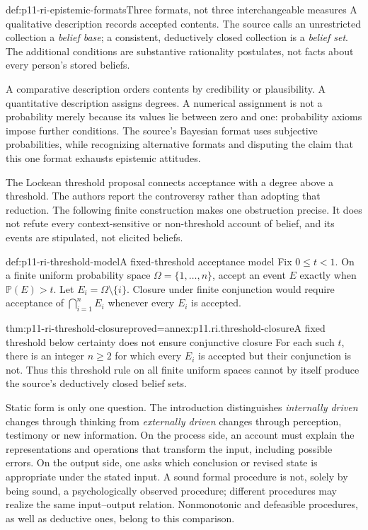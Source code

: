 \begin{hbdefinition}{def:p11-ri-epistemic-formats}{Three formats, not three interchangeable measures}
A qualitative description records accepted contents. The source calls
an unrestricted collection a \emph{belief base}; a consistent,
deductively closed collection is a \emph{belief set}. The additional
conditions are substantive rationality postulates, not facts about every
person's stored beliefs.

A comparative description orders contents by credibility or plausibility.
A quantitative description assigns degrees. A numerical assignment is
not a probability merely because its values lie between zero and one:
probability axioms impose further conditions. The source's Bayesian
format uses subjective probabilities, while recognizing alternative
formats and disputing the claim that this one format exhausts epistemic
attitudes.
\end{hbdefinition}

The Lockean threshold proposal connects acceptance with a degree above
a threshold. The authors report the controversy rather than adopting
that reduction. The following finite construction makes one obstruction
precise. It does not refute every context-sensitive or non-threshold
account of belief, and its events are stipulated, not elicited beliefs.

\begin{hbdefinition}{def:p11-ri-threshold-model}{A fixed-threshold acceptance model}
Fix \(0\leq t<1\). On a finite uniform probability space
\(\Omega=\{1,\ldots,n\}\), accept an event \(E\) exactly when
\(\mathbb P(E)>t\). Let \(E_i=\Omega\setminus\{i\}\).
Closure under finite conjunction would require acceptance of
\(\bigcap_{i=1}^n E_i\) whenever every \(E_i\) is accepted.
\end{hbdefinition}

\begin{hbtheorem}{thm:p11-ri-threshold-closure}{proved=annex:p11.ri.threshold-closure}{A fixed threshold below certainty does not ensure conjunctive closure}
For each such \(t\), there is an integer \(n\geq2\) for which
every \(E_i\) is accepted but their conjunction is not. Thus this
threshold rule on all finite uniform spaces cannot by itself produce
the source's deductively closed belief sets.
\end{hbtheorem}

Static form is only one question. The introduction distinguishes
\emph{internally driven} changes through thinking from
\emph{externally driven} changes through perception, testimony or new
information. On the process side, an account must explain the
representations and operations that transform the input, including
possible errors. On the output side, one asks which conclusion or
revised state is appropriate under the stated input. A sound formal
procedure is not, solely by being sound, a psychologically observed
procedure; different procedures may realize the same input--output
relation. Nonmonotonic and defeasible procedures, as well as deductive
ones, belong to this comparison.


